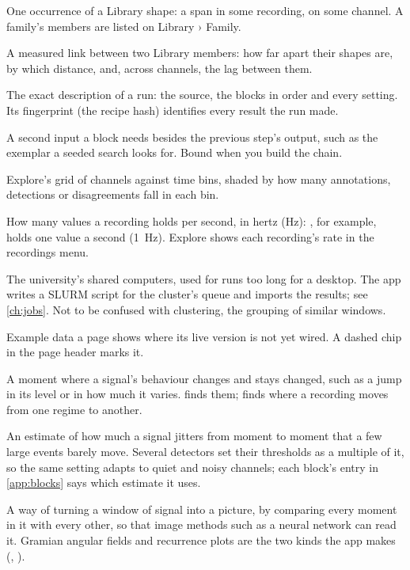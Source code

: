 \begin{glossarylist}
 One occurrence of a Library shape: a span in some recording, on
some channel. A family's members are listed on Library › Family.

 A measured link between two Library members: how far apart their
shapes are, by which distance, and, across channels, the lag between them.

 The exact description of a run: the source, the blocks in order
and every setting. Its fingerprint (the recipe hash) identifies every result the run made.

 A second input a block needs besides the previous step's
output, such as the exemplar a seeded search looks for. Bound when you build the chain.

 Explore's grid of channels against time bins, shaded
by how many annotations, detections or disagreements fall in each bin.

 How many values a recording holds per second, in
hertz (Hz): , for example, holds one value a second (1~Hz).
Explore shows each recording's rate in the recordings menu.

 The university's shared computers, used for runs
too long for a desktop. The app writes a SLURM script for the cluster's queue and imports
the results; see \cref{ch:jobs}. Not to be confused with clustering, the grouping of similar
windows.

 Example data a page shows where its live version is not yet
wired. A dashed  chip in the page header marks it.

 A moment where a signal's behaviour changes and stays
changed, such as a jump in its level or in how much it varies.
 finds them;  finds where a recording
moves from one regime to another.

 An estimate of how much a signal jitters from
moment to moment that a few large events barely move. Several detectors set their thresholds
as a multiple of it, so the same setting adapts to quiet and noisy channels; each block's
entry in \cref{app:blocks} says which estimate it uses.

 A way of turning a window of signal into a picture,
by comparing every moment in it with every other, so that image methods such as a neural
network can read it. Gramian angular fields and recurrence plots are the two kinds the app
makes (, ).


\end{glossarylist}
